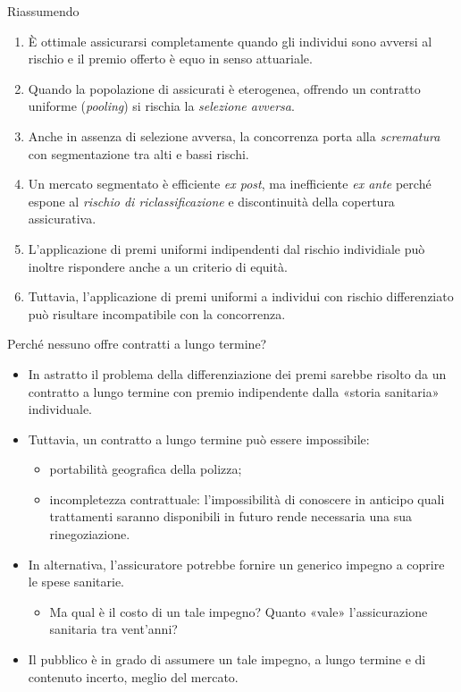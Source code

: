 \documentclass[aspectratio=64,12pt]{beamer}
\begin{document}
\begin{frame}{Riassumendo}
\begin{enumerate}
\item È ottimale assicurarsi completamente quando gli individui sono avversi al
rischio e il premio offerto è equo in senso attuariale.
\item Quando la popolazione di assicurati è eterogenea, offrendo un contratto
uniforme (\emph{pooling}) si rischia la \emph{selezione avversa}.
\item Anche in assenza di selezione avversa, la concorrenza porta alla
\emph{scrematura} con segmentazione tra alti e bassi rischi.
\item Un mercato segmentato è efficiente \emph{ex post}, ma inefficiente \emph{ex ante}
perché espone al \emph{rischio di riclassificazione} e discontinuità della
copertura assicurativa.
\item L'applicazione di premi uniformi indipendenti dal rischio individiale può
inoltre rispondere anche a un criterio di equità.
\item Tuttavia, l'applicazione di premi uniformi a individui con rischio
differenziato può risultare incompatibile con la concorrenza.
\end{enumerate}
\end{frame}

\begin{frame}{Perché nessuno offre contratti a lungo termine?}
\begin{itemize}
\item In astratto il problema della differenziazione dei premi sarebbe risolto
  da un contratto a lungo termine con premio indipendente dalla «storia
  sanitaria» individuale.
\item Tuttavia, un contratto a lungo termine può essere impossibile:
\begin{itemize}
\item portabilità geografica della polizza;
\item incompletezza contrattuale: l'impossibilità di conoscere in anticipo quali
trattamenti saranno disponibili in futuro rende necessaria una sua rinegoziazione.
\end{itemize}
\item In alternativa, l'assicuratore potrebbe fornire un generico impegno a
coprire le spese sanitarie.
\begin{itemize}
\item Ma qual è il costo di un tale impegno? Quanto «vale» l'assicurazione
  sanitaria tra vent'anni?
\end{itemize}
\item Il pubblico è in grado di assumere un tale impegno, a lungo termine e di
  contenuto incerto, meglio del mercato.
\end{itemize}
\end{frame}
\end{document}
